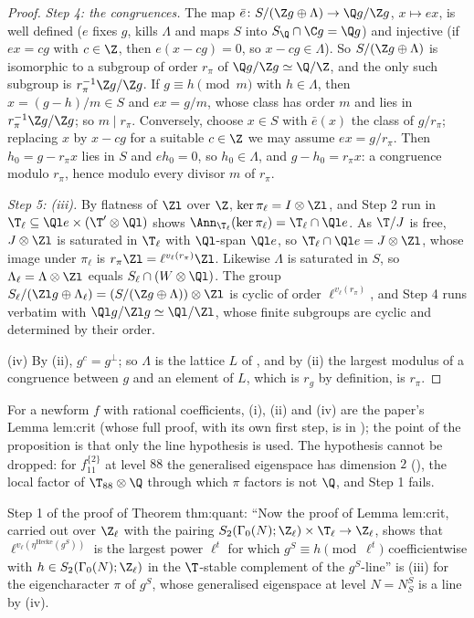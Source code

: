 \begin{proof}
\emph{Step 4: the congruences.} The map $\bar e\colon S/(\Z g\oplus\Lambda)\to\Q g/\Z g$, $x\mapsto ex$, is well defined ($e$ fixes $g$, kills $\Lambda$ and maps $S$ into $S_\Q\cap\C g=\Q g$) and
injective (if $ex=cg$ with $c\in\Z$, then $e(x-cg)=0$, so $x-cg\in\Lambda$). So $S/(\Z g\oplus\Lambda)$ is isomorphic to a subgroup of order $r_\pi$ of $\Q g/\Z g\simeq\Q/\Z$, and the only such
subgroup is $r_\pi^{-1}\Z g/\Z g$. If $g\equiv h\pmod m$ with $h\in\Lambda$, then $x=(g-h)/m\in S$ and $ex=g/m$, whose class has order $m$ and lies in $r_\pi^{-1}\Z g/\Z g$; so $m\mid r_\pi$.
Conversely, choose $x\in S$ with $\bar e(x)$ the class of $g/r_\pi$; replacing $x$ by $x-cg$ for a suitable $c\in\Z$ we may assume $ex=g/r_\pi$. Then $h_0=g-r_\pi x$ lies in $S$ and $eh_0=0$,
so $h_0\in\Lambda$, and $g-h_0=r_\pi x$: a congruence modulo $r_\pi$, hence modulo every divisor $m$ of $r_\pi$.

\emph{Step 5: (iii).} By flatness of $\Zl$ over $\Z$, $\ker\pi_\ell=I\otimes\Zl$, and Step 2 run in $\T_\ell\subseteq\Ql e\times(\T'\otimes\Ql)$ shows $\Ann_{\T_\ell}(\ker\pi_\ell)=\T_\ell\cap\Ql e$. As $\T/J$ is
free, $J\otimes\Zl$ is saturated in $\T_\ell$ with $\Ql$-span $\Ql e$, so $\T_\ell\cap\Ql e=J\otimes\Zl$, whose image under $\pi_\ell$ is $r_\pi\Zl=\ell^{v_\ell(r_\pi)}\Zl$. Likewise $\Lambda$ is saturated in $S$, so
$\Lambda_\ell=\Lambda\otimes\Zl$ equals $S_\ell\cap(W\otimes\Ql)$. The group $S_\ell/(\Zl g\oplus\Lambda_\ell)=(S/(\Z g\oplus\Lambda))\otimes\Zl$ is cyclic of order $\ell^{v_\ell(r_\pi)}$, and Step 4 runs verbatim
with $\Ql g/\Zl g\simeq\Ql/\Zl$, whose finite subgroups are cyclic and determined by their order.

(iv) By (ii), $g^c=g^\perp$; so $\Lambda$ is the lattice $L$ of , and by (ii) the largest modulus of a congruence between $g$ and an
element of $L$, which is $r_g$ by definition, is $r_\pi$.
\end{proof}

For a newform $f$ with rational coefficients, (i), (ii) and (iv) are the paper's Lemma lem:crit (whose full proof, with its own first step, is in ); the point of
the proposition is that only the line hypothesis is used. The hypothesis cannot be dropped: for $f_{11}^{\{2\}}$ at level $88$ the generalised eigenspace has dimension $2$
(), the local factor of $\T_{88}\otimes\Q$ through which $\pi$ factors is not $\Q$, and Step 1 fails.

\begin{paperlink}\label{pl:hecke:congruence-module}
Step 1 of the proof of Theorem thm:quant: ``Now the proof of Lemma lem:crit, carried out over $\Z_\ell$ with the pairing $S_2(\Gamma_0(N);\Z_\ell)\times\T_\ell\to\Z_\ell$, shows that
$\ell^{v_\ell(\eta^{\mathrm{Hecke}}(g^S))}$ is the largest power $\ell^t$ for which $g^S\equiv h\pmod{\ell^t}$ coefficientwise with $h\in S_2(\Gamma_0(N);\Z_\ell)$ in the $\T$-stable complement of
the $g^S$-line'' is (iii) for the eigencharacter $\pi$ of $g^S$, whose generalised eigenspace at level $N=N_S^S$ is a line by (iv).
\end{paperlink}

